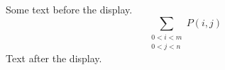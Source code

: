 \documentclass[12pt]{article}
\begin{document}
Some text before the display.
\[ \sum_{\substack{0 < i < m \\ 0 < j < n}} P(i, j) \]
Text after the display.
\end{document}
